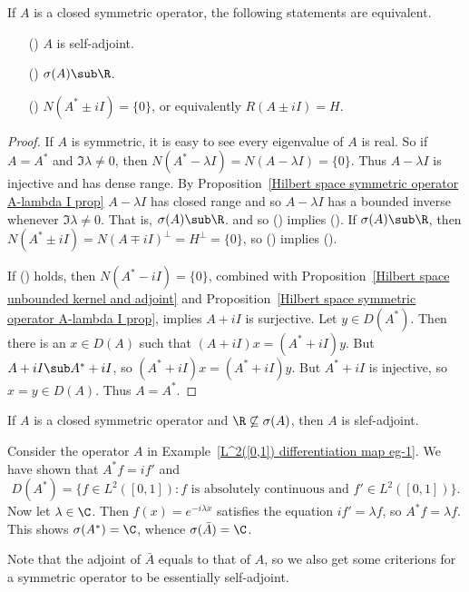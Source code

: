 \begin{corollary}\label{Hilbert space closed symmetric is self-adjoint iff real spectrum}
If $A$ is a closed symmetric operator, the following statements are equivalent.
\begin{itemize}
\item[(\rmnum{1})] $A$ is self-adjoint.
\item[(\rmnum{2})] $\sigma(A)\sub\R$.
\item[(\rmnum{3})] $N(A^*\pm iI)=\{0\}$, or equivalently $R(A\pm iI)=H$.
\end{itemize}
\end{corollary}
\begin{proof}
If $A$ is symmetric, it is easy to see every eigenvalue of $A$ is real. So if $A=A^*$ and $\Im\lambda\neq 0$, then $N(A^*-\lambda I)=N(A-\lambda I)=\{0\}$. Thus $A-\lambda I$ is injective and has dense range. By Proposition~\ref{Hilbert space symmetric operator A-lambda I prop} $A-\lambda I$ has closed range and so $A-\lambda I$ has a bounded inverse whenever $\Im\lambda\neq 0$. That is, $\sigma(A)\sub\R$. and so () implies (). If $\sigma(A)\sub\R$, then $N(A^*\pm iI)=N(A\mp iI)^\bot=H^\bot=\{0\}$, so () implies ().\par
If () holds, then $N(A^*-iI)=\{0\}$, combined with Proposition~\ref{Hilbert space unbounded kernel and adjoint} and Proposition~\ref{Hilbert space symmetric operator A-lambda I prop}, implies $A+iI$ is surjective. Let $y\in D(A^*)$. Then there is an $x\in D(A)$ such that $(A+iI)x=(A^*+iI)y$. But $A+iI\sub A^*+iI$, so $(A^*+iI)x=(A^*+iI)y$. But $A^*+iI$ is injective, so $x=y\in D(A)$. Thus $A=A^*$.
\end{proof}
\begin{corollary}\label{Hilbert space closed symmetric R not in spectrum}
If $A$ is a closed symmetric operator and $\R\not\subseteq\sigma(A)$, then $A$ is slef-adjoint.
\end{corollary}
\begin{example}
Consider the operator $A$ in Example~\ref{L^2([0,1]) differentiation map eg-1}. We have shown that $A^*f=if'$ and
\[D(A^*)=\{f\in L^2([0,1]):\text{$f$ is absolutely
continuous and $f'\in L^2([0,1])$}\}.\]
Now let $\lambda\in\C$. Then $f(x)=e^{-i\lambda x}$ satisfies the equation $if'=\lambda f$, so $A^*f=\lambda f$. This shows $\sigma(A^*)=\C$, whence $\sigma(\bar{A})=\C$.
\end{example}
Note that the adjoint of $\bar{A}$ equals to that of $A$, so we also get some criterions for a symmetric operator to be essentially self-adjoint.
